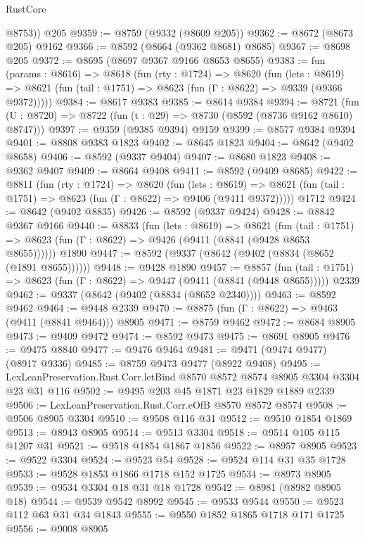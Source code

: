\begin{lexlean}{RustCore}
\begin{coremodule}
        @8753))
    @205
@9359 := @8759 (@9332 (@8609 @205))
@9362 := @8672 (@8673 @205) @9162
@9366 := @8592 (@8664 (@9362 @8681) @8685)
@9367 := @8698 @205
@9372 := @8695 (@8697 @9367 @9166 @8653 @8655)
@9383 := fun (params : @8616) =>
  @8618
    (fun (rty : @1724) =>
    @8620
      (fun (lets : @8619) =>
      @8621 (fun (tail : @1751) => @8623 (fun (Γ : @8622) => @9339 (@9366 @9372)))))
@9384 := @8617 @9383
@9385 := @8614 @9384
@9394 := @8721 (fun (U : @8720) => @8722 (fun (t : @29) => @8730 (@8592 (@8736 @9162 @8610) @8747)))
@9397 := @9359 (@9385 @9394) @9159
@9399 := @8577 @9384 @9394
@9401 := @8808 @9383 @1823
@9402 := @8645 @1823
@9404 := @8642 (@9402 @8658)
@9406 := @8592 (@9337 @9404)
@9407 := @8680 @1823
@9408 := @9362 @9407
@9409 := @8664 @9408
@9411 := @8592 (@9409 @8685)
@9422 := @8811
    (fun (rty : @1724) =>
    @8620
      (fun (lets : @8619) =>
      @8621 (fun (tail : @1751) => @8623 (fun (Γ : @8622) => @9406 (@9411 @9372)))))
    @1712
@9424 := @8642 (@9402 @8835)
@9426 := @8592 (@9337 @9424)
@9428 := @8842 @9367 @9166
@9440 := @8833
    (fun (lets : @8619) =>
    @8621
      (fun (tail : @1751) => @8623 (fun (Γ : @8622) => @9426 (@9411 (@8841 (@9428 @8653 @8655))))))
    @1890
@9447 := @8592 (@9337 (@8642 (@9402 (@8834 (@8652 (@1891 @8655))))))
@9448 := @9428 @1890
@9457 := @8857
    (fun (tail : @1751) => @8623 (fun (Γ : @8622) => @9447 (@9411 (@8841 (@9448 @8655)))))
    @2339
@9462 := @9337 (@8642 (@9402 (@8834 (@8652 @2340))))
@9463 := @8592 @9462
@9464 := @9448 @2339
@9470 := @8875 (fun (Γ : @8622) => @9463 (@9411 (@8841 @9464))) @8905
@9471 := @8759 @9462
@9472 := @8684 @8905
@9473 := @9409 @9472
@9474 := @8592 @9473
@9475 := @8691 @8905
@9476 := @9475 @8840
@9477 := @9476 @9464
@9481 := @9471 (@9474 @9477) (@8917 @9336)
@9485 := @8759 @9473 @9477 (@8922 @9408)
@9495 := LexLeanPreservation.Rust.Corr.letBind @8570 @8572 @8574 @8905 @3304 @3304 @23 @31 @116
@9502 := @9495 @203 @45 @1871 @23 @1829 @1889 @2339
@9506 := LexLeanPreservation.Rust.Corr.eOfB @8570 @8572 @8574
@9508 := @9506 @8905 @3304
@9510 := @9508 @116 @31
@9512 := @9510 @1854 @1869
@9513 := @8943 @8905
@9514 := @9513 @3304
@9518 := @9514 @105 @115 @1207 @31
@9521 := @9518 @1854 @1867 @1856
@9522 := @8957 @8905
@9523 := @9522 @3304
@9524 := @9523 @54
@9528 := @9524 @114 @31 @35 @1728
@9533 := @9528 @1853 @1866 @1718 @152 @1725
@9534 := @8973 @8905
@9539 := @9534 @3304 @18 @31 @18 @1728
@9542 := @8981 (@8982 @8905 @18)
@9544 := @9539 @9542 @8992
@9545 := @9533 @9544
@9550 := @9523 @112 @63 @31 @34 @1843
@9555 := @9550 @1852 @1865 @1718 @171 @1725
@9556 := @9008 @8905

\end{coremodule}
\end{lexlean}
